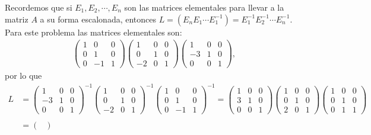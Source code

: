 \documentclass[11pt,letterpaper]{article}
\begin{document}
\begin{enumerate}
Recordemos que si $E_1,E_2, \cdots ,E_n$ son las matrices elementales para llevar a la matriz $A$ a su forma escalonada, entonces $L=(E_n E_1 \cdots  E_1^{-1})=E_1^{-1} E_2^{-1}\cdots E_n^{-1}$. Para este problema las matrices elementales son:
\begin{align*}
\begin{pmatrix}
1 & 0 & 0\\
0 & 1 & 0\\
0 &-1 & 1
\end{pmatrix}
\begin{pmatrix}
 1 & 0 & 0\\
 0 & 1 & 0\\
-2 & 0 & 1
\end{pmatrix}
\begin{pmatrix}
 1 & 0 & 0\\
-3 & 1 & 0\\
 0 & 0 & 1
\end{pmatrix},
\end{align*}
por lo que 
\begin{align*}
L&= \begin{pmatrix}
 1 & 0 & 0\\
-3 & 1 & 0\\
 0 & 0 & 1
\end{pmatrix}^{-1}\begin{pmatrix}
 1 & 0 & 0\\
 0 & 1 & 0\\
-2 & 0 & 1
\end{pmatrix}^{-1}
\begin{pmatrix}
1 & 0 & 0\\
0 & 1 & 0\\
0 &-1 & 1
\end{pmatrix}^{-1}=
\begin{pmatrix}
 1 & 0 & 0\\
 3 & 1 & 0\\
 0 & 0 & 1
\end{pmatrix}
\begin{pmatrix}
 1 & 0 & 0\\
 0 & 1 & 0\\
 2 & 0 & 1
\end{pmatrix}
\begin{pmatrix}
1 & 0 & 0\\
0 & 1 & 0\\
0 & 1 & 1
\end{pmatrix}\\ \\
&=\begin{pmatrix}

\end{pmatrix}
\end{align*}
\end{enumerate}
\end{document}
